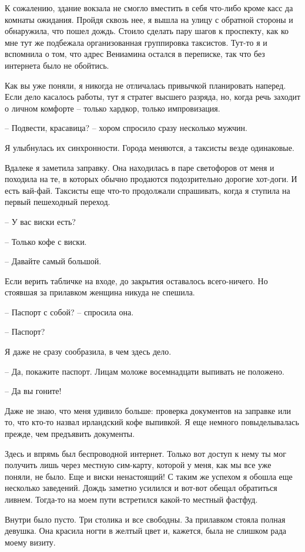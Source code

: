\documentclass[
]{book}
\begin{document}
К сожалению, здание вокзала не смогло вместить в себя что-либо кроме касс да комнаты ожидания. Пройдя сквозь нее, я вышла на улицу с обратной стороны и обнаружила, что пошел дождь. Стоило сделать пару шагов к проспекту, как ко мне тут же подбежала организованная группировка таксистов. Тут-то я и вспомнила о том, что адрес Вениамина остался в переписке, так что без интернета было не обойтись.

Как вы уже поняли, я никогда не отличалась привычкой планировать наперед. Если дело касалось работы, тут я стратег высшего разряда, но, когда речь заходит о личном комфорте -- только хардкор, только импровизация.

-- Подвести, красавица? -- хором спросило сразу несколько мужчин.

Я улыбнулась их синхронности. Города меняются, а таксисты везде одинаковые.

Вдалеке я заметила заправку. Она находилась в паре светофоров от меня и походила на те, в которых обычно продаются подозрительно дорогие хот-доги. И есть вай-фай. Таксисты еще что-то продолжали спрашивать, когда я ступила на первый пешеходный переход.

-- У вас виски есть?

-- Только кофе с виски.

-- Давайте самый большой.

Если верить табличке на входе, до закрытия оставалось всего-ничего. Но стоявшая за прилавком женщина никуда не спешила.

-- Паспорт с собой? -- спросила она.

-- Паспорт?

Я даже не сразу сообразила, в чем здесь дело.

-- Да, покажите паспорт. Лицам моложе восемнадцати выпивать не положено.

-- Да вы гоните!

Даже не знаю, что меня удивило больше: проверка документов на заправке или то, что кто-то назвал ирландский кофе
выпивкой. Я еще немного повыделывалась прежде, чем предъявить документы.

Здесь и впрямь был беспроводной интернет. Только вот доступ к нему ты мог получить лишь через местную сим-карту, которой у меня, как мы все уже поняли, не было. Еще и виски ненастоящий! С таким же успехом я обошла еще несколько заведений. Дождь заметно усилился и вот-вот обещал обратиться ливнем. Тогда-то на моем пути встретился какой-то местный фастфуд.

Внутри было пусто. Три столика и все свободны. За прилавком стояла полная девушка. Она красила ногти в желтый цвет и, кажется, была не слишком рада моему визиту.
\end{document}
